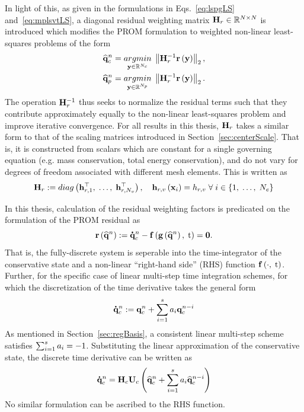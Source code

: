 In light of this, as given in the formulations in Eqs.~\ref{eq:lspgLS} and~\ref{eq:mplsvtLS}, a diagonal residual weighting matrix $\resScale \in \RTwo{\numDOF}{\numDOF}$ is introduced which modifies the PROM formulation to weighted non-linear least-squares problems of the form
%
\begin{align}
    \consVecCoef^{\timeIdx} &= \argmin{\dummyVec \inROne{\numConsModes}} \left\Vert \resScaleInv \resFunc{\dummyVec} \right\Vert_2, \\
    \primVecCoef^{\timeIdx} &= \argmin{\dummyVec \inROne{\numPrimModes}} \left\Vert \resScaleInv \resFunc{\dummyVec} \right\Vert_2.
\end{align}
%
The operation $\resScaleInv$ thus seeks to normalize the residual terms such that they contribute approximately equally to the non-linear least-squares problem and improve iterative convergence. For all results in this thesis, $\resScale$ takes a similar form to that of the scaling matrices introduced in Section~\ref{sec:centerScale}. That is, it is constructed from scalars which are constant for a single governing equation (e.g. mass conservation, total energy conservation), and do not vary for degrees of freedom associated with different mesh elements. This is written as
%
\begin{equation}
    \resScale \defEq diag\left(\resScaleVecVar{1}^\top, \; \hdots, \; \resScaleVecVar{\numVars}^\top \right), \quad \resScaleVecVar{\varIdx}\left(\spatialVec_{\dummyIdx}\right) = \resScaleVar{\varIdx} \; \forall \; \dummyIdx \in \{1, \; \hdots, \; \numCells\}
\end{equation}
%

In this thesis, calculation of the residual weighting factors is predicated on the formulation of the PROM residual as
%
\begin{equation}
    \mathbf{r}\left(\mathbf{\widehat{q}}^{n}\right) := \accentset{\mbox{\large\bfseries .}}{\mathbf{q}}_{c}^{n} - \mathbf{f} \left(\mathbf{g} \left(\mathbf{\widehat{q}}^{n}\right), \; \text{t}\right) = \mathbf{0}.
\end{equation}
%
That is, the fully-discrete system is seperable into the time-integrator of the conservative state and a non-linear ``right-hand side'' (RHS) function $\mathbf{f} \left(\cdot, \; \text{t}\right)$. Further, for the specific case of linear multi-step time integration schemes, for which the discretization of the time derivative takes the general form
%
\begin{equation}
	\accentset{\mbox{\large\bfseries .}}{\mathbf{q}}_{c}^{n} := \mathbf{q}_{c}^{n} + \sum_{i=1}^{s} a_{i} \mathbf{q}_{c}^{n-i}
\end{equation}
%
As mentioned in Section~\ref{sec:regBasis}, a consistent linear multi-step scheme satisfies $\sum_{i=1}^{s} a_{i} = -1$. Substituting the linear approximation of the conservative state, the discrete time derivative can be written as
%
\begin{equation}
	\consVecDt^{\timeIdx} = \consScale \consTrial \left(\consVecCoef^{\timeIdx} + \sum_{\dummyIdx=1}^{s} a_{\dummyIdx} \consVecCoef^{\timeIdx-\dummyIdx} \right)
\end{equation}
%
No similar formulation can be ascribed to the RHS function.

